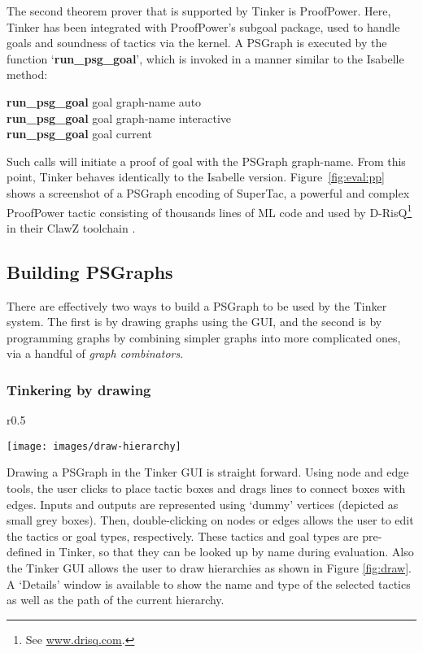 \documentclass[submission,copyright,creativecommons]{eptcs}
\begin{document}
The second theorem prover that is supported by Tinker is ProofPower. Here, Tinker has been integrated with ProofPower's subgoal package, used to 
handle goals and soundness of tactics via the kernel. A PSGraph is executed by the function `\textbf{run\_psg\_goal}', which is invoked in a manner similar to the Isabelle method:
\begin{tabbing}
\sf\qquad\quad\textbf{run\_psg\_goal} goal graph-name auto\\
\sf\qquad\quad\textbf{run\_psg\_goal} goal graph-name interactive\\
\sf\qquad\quad\textbf{run\_psg\_goal} goal current
\end{tabbing}
Such calls will initiate a proof of goal with the PSGraph \textsf{graph-name}. From this point, Tinker behaves identically to the Isabelle version. Figure~\ref{fig:eval:pp} shows a screenshot of a PSGraph encoding of SuperTac, a powerful and complex ProofPower tactic consisting of thousands lines of ML code and used by D-RisQ\footnote{See \url{www.drisq.com}.} in their ClawZ toolchain \cite{OHalloran13}.


\subsection{Building PSGraphs}

There are effectively two ways to build a PSGraph to be used by the Tinker system. The first is by drawing graphs using the GUI, and the second is by 
programming graphs by combining simpler graphs into more complicated ones, via a handful of \textit{graph combinators}.

\subsubsection{Tinkering by drawing}

\begin{wrapfigure}[11]{r}{0.5\textwidth}
\vspace{-50pt}
\begin{center}
\texttt{[image: images/draw-hierarchy]}
\end{center}
\vspace{-10pt}
\caption{Tinker Drawing GUI}\label{fig:draw}
\end{wrapfigure}
Drawing a PSGraph in the Tinker GUI is straight forward. Using node and edge tools, the user clicks to place tactic boxes and drags lines to connect boxes with edges. Inputs and outputs are represented using `dummy' vertices (depicted as small grey boxes). Then, double-clicking on nodes or edges allows the user to edit the tactics or goal types, respectively. These tactics and goal types are pre-defined in Tinker, so that they can be looked up by name during evaluation. Also the Tinker GUI allows the user to draw hierarchies as shown in Figure  \ref {fig:draw}. A `Details' window is available to show the name and type of the selected tactics as well as the path of the current hierarchy.
\end{document}
